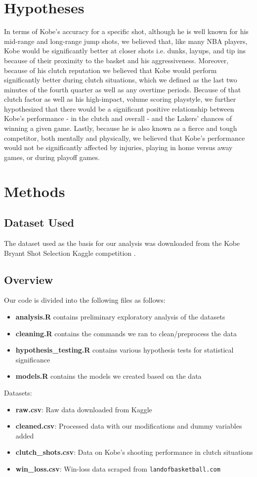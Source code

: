 \documentclass[paper=a4, fontsize=11pt]{scrartcl} %
\numberwithin{equation}{section} %
\numberwithin{figure}{section} %
\numberwithin{table}{section} %
\begin{document}
\section{Hypotheses}
\hspace*{1cm}In terms of Kobe's accuracy for a specific shot, although he is well known for his mid-range and long-range jump shots, we believed that, like many NBA players, Kobe would be significantly better at closer shots i.e. dunks, layups, and tip ins because of their proximity to the basket and his aggressiveness. Moreover, because of his clutch reputation we believed that Kobe would perform significantly better during clutch situations, which we defined as the last two minutes of the fourth quarter as well as any overtime periods. Because of that clutch factor as well as his high-impact, volume scoring playstyle, we further hypothesized that there would be a significant positive relationship between Kobe's performance - in the clutch and overall - and the Lakers' chances of winning a given game. Lastly, because he is also known as a fierce and tough competitor, both mentally and physically, we believed that Kobe's performance would not be significantly affected by injuries, playing in home versus away games, or during playoff games.
\section{Methods}
	\subsection{Dataset Used}
	\hspace*{1cm}The dataset used as the basis for our analysis was downloaded from the Kobe Bryant Shot Selection Kaggle competition \cite{kagglecompetition}.
	\subsection{Overview}
	Our code is divided into the following files as follows:
		\begin{itemize}
			\item \textbf{analysis.R} contains preliminary exploratory analysis of the datasets
			\item \textbf{cleaning.R} contains the commands we ran to clean/preprocess the data
			\item \textbf{hypothesis\_testing.R} contains various hypothesis tests for statistical significance
			\item \textbf{models.R} contains the models we created based on the data
		\end{itemize}
	Datasets:
		\begin{itemize}
			\item \textbf{raw.csv}: Raw data downloaded from Kaggle
			\item \textbf{cleaned.csv}: Processed data with our modifications and dummy variables added
			\item \textbf{clutch\_shots.csv}: Data on Kobe's shooting performance in clutch situations
			\item \textbf{win\_loss.csv}: Win-loss data scraped from \texttt{landofbasketball.com}
		\end{itemize}
\end{document}

